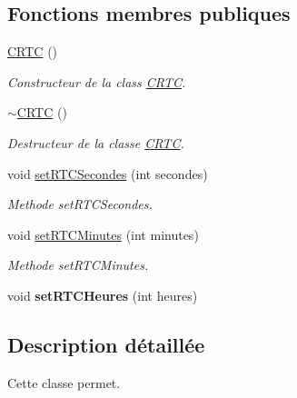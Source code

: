 \subsection*{Fonctions membres publiques}
\begin{DoxyCompactItemize}
\item 
\hypertarget{classCRTC_a33e0a6ea050334a64bc660d8848ce6a0}{\hyperlink{classCRTC_a33e0a6ea050334a64bc660d8848ce6a0}{C\+R\+T\+C} ()}\label{classCRTC_a33e0a6ea050334a64bc660d8848ce6a0}

\begin{DoxyCompactList}\small\item\em Constructeur de la class \hyperlink{classCRTC}{C\+R\+T\+C}. \end{DoxyCompactList}\item 
\hypertarget{classCRTC_a3bb3189c660840a22c45a6a94276a607}{\hyperlink{classCRTC_a3bb3189c660840a22c45a6a94276a607}{$\sim$\+C\+R\+T\+C} ()}\label{classCRTC_a3bb3189c660840a22c45a6a94276a607}

\begin{DoxyCompactList}\small\item\em Destructeur de la classe \hyperlink{classCRTC}{C\+R\+T\+C}. \end{DoxyCompactList}\item 
void \hyperlink{classCRTC_acc2b369b4a007ebbe50097ba647aee61}{set\+R\+T\+C\+Secondes} (int secondes)
\begin{DoxyCompactList}\small\item\em Methode set\+R\+T\+C\+Secondes. \end{DoxyCompactList}\item 
void \hyperlink{classCRTC_af28086ce512a8697c4641f13dba676d8}{set\+R\+T\+C\+Minutes} (int minutes)
\begin{DoxyCompactList}\small\item\em Methode set\+R\+T\+C\+Minutes. \end{DoxyCompactList}\item 
\hypertarget{classCRTC_a3d03c193f47d4950e4727db7d0a96899}{void {\bfseries set\+R\+T\+C\+Heures} (int heures)}\label{classCRTC_a3d03c193f47d4950e4727db7d0a96899}

\end{DoxyCompactItemize}


\subsection{Description détaillée}
Cette classe permet. 

